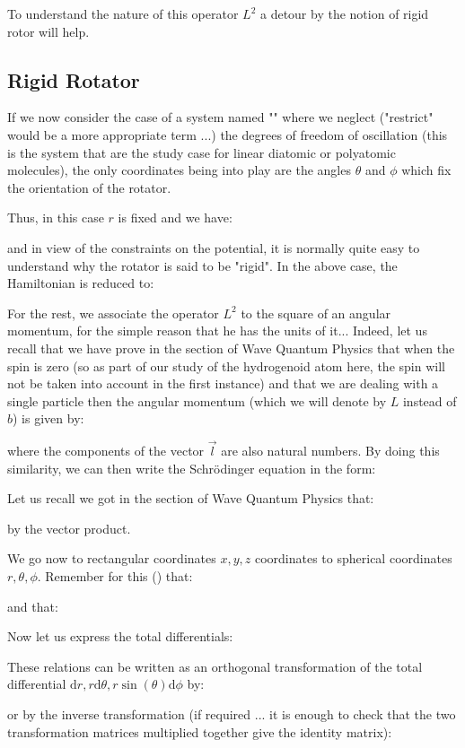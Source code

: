	To understand the nature of this operator $L^2$ a detour by the notion of rigid rotor will help.
	
	\subsection{Rigid Rotator}
	If we now consider the case of a system named "" where we neglect ("restrict" would be a more appropriate term ...) the degrees of freedom of oscillation (this is the system that are the study case for linear diatomic or polyatomic molecules), the only coordinates being into play are the angles $\theta$ and $\phi$ which fix the orientation of the rotator.
	
	Thus, in this case $r$ is fixed and we have:
	
	and in view of the constraints on the potential, it is normally quite easy to understand why the rotator is said to be "rigid". In the above case, the Hamiltonian is reduced to:
	
	
	For the rest, we associate the operator $L^2$ to the square of an angular momentum, for the simple reason that he has the units of it... Indeed, let us recall that we have prove in the section of Wave Quantum Physics that when the spin is zero (so as part of our study of the hydrogenoid atom here, the spin will not be taken into account in the first instance) and that we are dealing with a single particle then the angular momentum (which we will denote by $L$ instead of $b$) is given by:
	
	where the components of the vector $\vec{l}$ are also natural numbers. By doing this similarity, we can then write the Schrödinger equation in the form:
	
	Let us recall we got in the section of Wave Quantum Physics that:
	
	by the vector product.
	
	We go now to rectangular coordinates $x, y, z$ coordinates to spherical coordinates $r,\theta,\phi$. Remember for this () that:
	
	and that:
	
	Now let us express the total differentials:
	
	These relations can be written as an orthogonal transformation of the total differential $\mathrm{d}r,r\mathrm{d}\theta,r\sin(\theta)\mathrm{d}\phi$ by:
	
	or by the inverse transformation (if required ... it is enough to check that the two transformation matrices multiplied together give the identity matrix):
	
